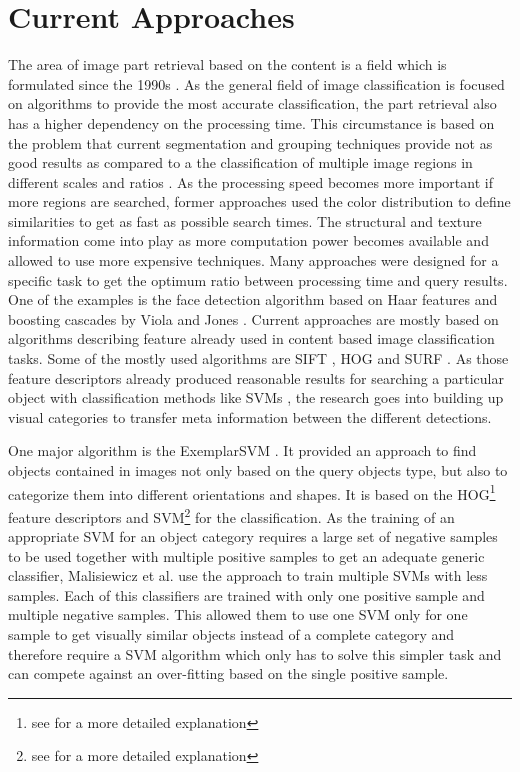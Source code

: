 \chapter{Current Approaches}

The area of image part retrieval based on the content is a field which is formulated since the 1990s \cite{eakins1999content} \cite{rui1997content} \cite{osuna1997training}. As the general field of image classification is focused on algorithms to provide the most accurate classification, the part retrieval also has a higher dependency on the processing time. This circumstance is based on the problem that current segmentation and grouping techniques provide not as good results as compared to a the classification of multiple image regions in different scales and ratios \cite{book:848523}. As the processing speed becomes more important if more regions are searched, former approaches used the color distribution to define similarities to get as fast as possible search times. The structural and texture information come into play as more computation power becomes available and allowed to use more expensive techniques. Many approaches were designed for a specific task to get the optimum ratio between processing time and query results. One of the examples is the face detection algorithm based on Haar features and boosting cascades by Viola and Jones \cite{viola2001rapid}. Current approaches are mostly based on algorithms describing feature already used in content based image classification tasks. Some of the mostly used algorithms are \acf{SIFT} \cite{Lowe2004}, \acf{HOG} \cite{Dalal2005} and \acf{SURF} \cite{bay2008speeded}. As those feature descriptors already produced reasonable results for searching a particular object with classification methods like \aclp{SVM} \cite{cortes1995support}, the research goes into building up visual categories to transfer meta information between the different detections.

One major algorithm is the ExemplarSVM \cite{Malisiewicz2011}. It provided an approach to find objects contained in images not only based on the query objects type, but also to categorize them into different orientations and shapes.
It is based on the \ac{HOG}\footnote{see  for a more detailed explanation} feature descriptors and \ac{SVM}\footnote{see  for a more detailed explanation} for the classification. As the training of an appropriate \ac{SVM} for an object category requires a large set of negative samples to be used together with multiple positive samples to get an adequate generic classifier, Malisiewicz et al. use the approach to train multiple \acp{SVM} with less samples. Each of this classifiers are trained with only one positive sample and multiple negative samples. This allowed them to use one \ac{SVM} only for one sample to get visually similar objects instead of a complete category and therefore require a \ac{SVM} algorithm which only has to solve this simpler task and can compete against an over-fitting based on the single positive sample.

